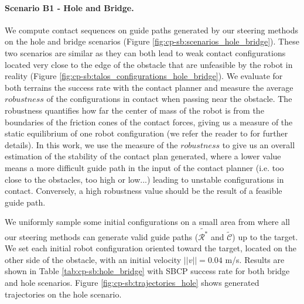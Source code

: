 \paragraph{Scenario B1 - Hole and Bridge.} 
We compute contact sequences on guide paths generated by our steering methods on the hole and bridge scenarios (Figure \ref{fig:cp-sb:scenarios_hole_bridge}). 
These two scenarios are similar as they can both lead to weak contact configurations located very close to the edge of the obstacle that are unfeasible by the robot in reality (Figure \ref{fig:cp-sb:talos_configurations_hole_bridge}).
We evaluate for both terrains the success rate with the contact planner and measure the average $robustness$ of the configurations in contact when passing near the obstacle.
The robustness quantifies how far the center of mass of the robot is from the boundaries of the friction cones of the contact forces, giving us a measure of the static equilibrium of one robot configuration (we refer the reader to \cite{AcyclicCP} for further details).
In this work, we use the measure of the $robustness$ to give us an overall estimation of the stability of the contact plan generated, where a lower value means a more difficult guide path in the input of the contact planner (i.e. too close to the obstacles, too high or low...) leading to unstable configurations in contact.
Conversely, a high robustness value should be the result of a  feasible guide path.

 


We uniformly sample some initial configurations on a small area from where all our steering methods can generate valid guide paths ($\tilde{\mathcal{R}^*}$ and $\tilde{\mathcal{C}}$) up to the target.
We set each initial robot configuration oriented toward the target, located on the other side of the obstacle, with an initial velocity $||v||=0.04$ m/s.
Results are shown in Table \ref{tab:cp-sb:hole_bridge} with SBCP success rate for both bridge and hole scenarios. Figure \ref{fig:cp-sb:trajectories_hole} shows generated trajectories on the hole scenario.


